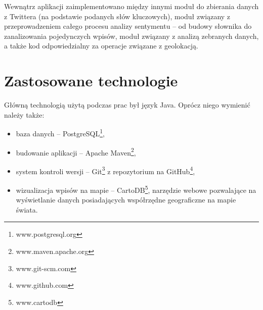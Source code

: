 Wewnątrz aplikacji zaimplementowano między innymi moduł do zbierania danych z
Twittera (na podstawie podanych słów kluczowych), moduł związany z
przeprowadzeniem całego procesu analizy sentymentu -- od budowy słownika do
zanalizowania pojedynczych wpisów, moduł związany z analizą zebranych danych,
a także kod odpowiedzialny za operacje związane z geolokacją.

\section{Zastosowane technologie}
\label{section:zastosowanetechnologie}
Główną technologią użytą podczas prac był język Java. Oprócz niego wymienić
należy także:
\begin{itemize}
  \item baza danych -- PostgreSQL\footnote{www.postgresql.org},
  \item budowanie aplikacji -- Apache Maven\footnote{www.maven.apache.org},
  \item system kontroli wersji -- Git\footnote{www.git-scm.com} z 
  repozytorium na GitHub\footnote{www.github.com},
  \item wizualizacja wpisów na mapie -- CartoDB\footnote{www.cartodb},
  narzędzie webowe pozwalające na wyświetlanie danych posiadających współrzędne
  geograficzne na mapie świata.
\end{itemize}
